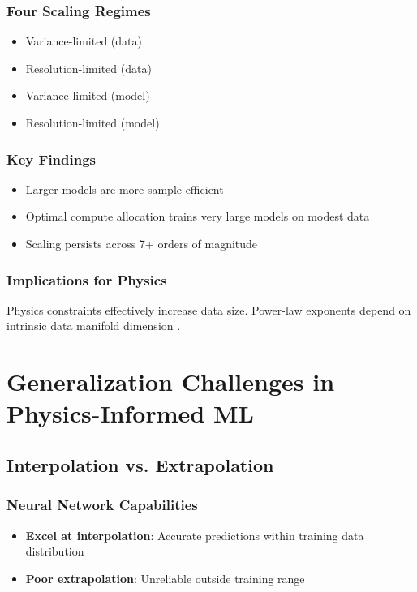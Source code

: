 \subsection{Four Scaling Regimes}
\begin{itemize}
    \item Variance-limited (data)
    \item Resolution-limited (data)
    \item Variance-limited (model)
    \item Resolution-limited (model)
\end{itemize}

\subsection{Key Findings}
\begin{itemize}
    \item Larger models are more sample-efficient
    \item Optimal compute allocation trains very large models on modest data
    \item Scaling persists across 7+ orders of magnitude
\end{itemize}

\subsection{Implications for Physics}
Physics constraints effectively increase data size. Power-law exponents depend on intrinsic data manifold dimension \cite{kaplan2020}.

\chapter{Generalization Challenges in Physics-Informed ML}

\section{Interpolation vs. Extrapolation}

\subsection{Neural Network Capabilities}
\begin{itemize}
    \item \textbf{Excel at interpolation}: Accurate predictions within training data distribution
    \item \textbf{Poor extrapolation}: Unreliable outside training range
\end{itemize}


